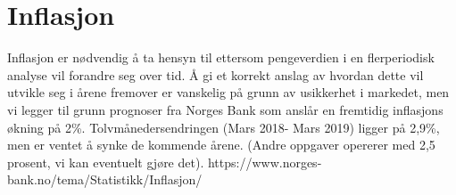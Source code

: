 \section{Inflasjon}
Inflasjon er nødvendig å ta hensyn til ettersom pengeverdien i en flerperiodisk analyse vil forandre seg over tid. Å gi et korrekt anslag av hvordan dette vil utvikle seg i årene fremover er vanskelig på grunn av usikkerhet i markedet, men vi legger til grunn prognoser fra Norges Bank som anslår en fremtidig inflasjons økning på 2\%. Tolvmånedersendringen (Mars 2018- Mars 2019) ligger på 2,9\%, men er ventet å synke de kommende årene. (Andre oppgaver opererer med 2,5 prosent, vi kan eventuelt gjøre det). https://www.norges-bank.no/tema/Statistikk/Inflasjon/